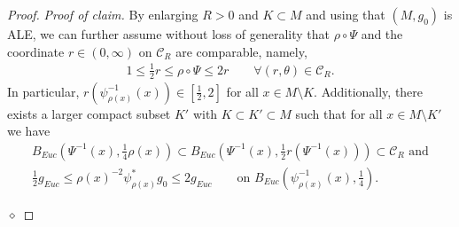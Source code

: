 \documentclass[12pt]{amsart}
\renewcommand{\1}{{\mathbf 1}}
\newcommand{\dist}{{\operatorname{dist}}}
\newenvironment{claimproof}{\par\noindent\textit{Proof of claim.}\space}{\hfill$\diamond$\medskip\par}
\theoremstyle{others}
\numberwithin{equation}{section}
\begin{document}
\begin{proof}
\begin{claimproof}
        By enlarging $R > 0$ and $K \subset M$ and using that $(M, g_0)$ is ALE, we can further assume without loss of generality that $\rho \circ \Psi$ and the coordinate $r \in (0, \infty)$ on $\mathcal C_R $ are comparable,
        namely,
        \begin{gather}
            \label{proof local higher order est, eqn 2.1}
            1 \le \frac12 r \le \rho \circ \Psi \le 2 r \qquad \forall (r, \theta) \in \mathcal C_R. %
        \end{gather}
        In particular, $r( \psi_{\rho(x)}^{-1} (x) ) \in \left[ \frac12 , 2 \right]$ for all $x \in M \setminus K$.
        Additionally, there exists a larger compact subset $K'$ with $K \subset K' \subset M$ such that for all $x \in M \setminus K'$ we have
        \begin{gather}
            \label{proof local higher order est, eqn 4.15}
            B_{Euc} \left( \Psi^{-1} (x) , \frac14 \rho( x)  \right) \subset B_{Euc} \left( \Psi^{-1} (x)  , \frac12 r( \Psi^{-1}(x)) \right) \subset \mathcal C_R \text{ and}  \\
             \label{proof higher order est, eqn 4.2}
            \frac12 g_{Euc} \le \rho(x)^{-2} \psi_{\rho(x)}^* g_0 \le 2 g_{Euc} \qquad \text{on }  B_{Euc} \left( \psi_{\rho(x)}^{-1} (x) , \frac14  \right) .%
        \end{gather}
            

\end{claimproof}
\end{proof}
\end{document}
